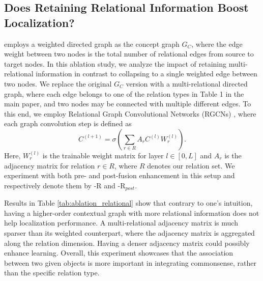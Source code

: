 \subsection{Does Retaining Relational Information Boost Localization?}\label{ablation:relatinal_coronet}
\modelname employs a weighted directed graph as the concept graph $G_C$, where the edge weight between two nodes is the total number of relational edges from source to target nodes. In this ablation study, we analyze the impact of retaining multi-relational information in contrast to collapsing to a single weighted edge between two nodes. We replace the original $G_C$ version with a multi-relational directed graph, where each edge belongs to one of the relation types in Table 1 in the main paper, and two nodes may be connected with multiple different edges. To this end, we employ Relational Graph Convolutional Networks (RGCNs) \cite{schlichtkrull2018modeling}, where each graph convolution step is defined as
\begin{equation}
\label{eq:rgcn}
    C^{\left(l+1\right)}=\sigma\left(\sum_{r \in R} A_{r} C^{(l)} W_{r}^{(l)}\right).
\end{equation}
Here, $W_{r}^{(l)}$ is the trainable weight matrix for layer $l \in \left[0, L\right]$ and $A_r$ is the adjacency matrix for relation $r \in R$, where $R$ denotes our relation set. 
We experiment with both pre- and post-fusion enhancement in this setup and respectively denote them by \modelname-R and \modelname-R$_{post}$. 


Results in Table \ref{tab:ablation_relational} show that contrary to one's intuition, having a higher-order contextual graph with more relational information does not help localization performance. A multi-relational adjacency matrix is much sparser than its weighted counterpart, where the adjacency matrix is aggregated along the relation dimension. Having a denser adjacency matrix could possibly enhance learning. Overall, this experiment showcases that the association between two given objects is more important in integrating commonsense, rather than the specific relation type.